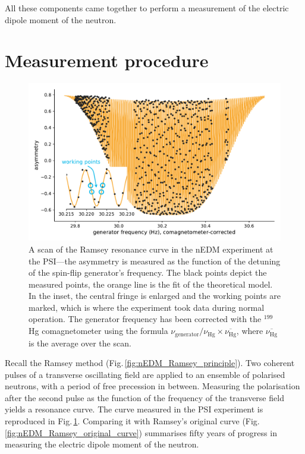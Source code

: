 All these components came together to perform a measurement of the electric dipole moment of the neutron.



\section{Measurement procedure}
\begin{figure}
  \centering
  \includegraphics[width=0.8\linewidth]{gfx/nEDMatPSI/ramsey_scan.pdf}
  \caption{A scan of the Ramsey resonance curve in the nEDM experiment at the PSI---the asymmetry is measured as the function of the detuning of the spin-flip generator's frequency. The black points depict the measured points, the orange line is the fit of the theoretical model. In the inset, the central fringe is enlarged and the working points are marked, which is where the experiment took data during normal operation. The generator frequency has been corrected with the $^{199}$Hg comagnetometer using the formula $\nu_\text{generator} / \nu_\text{Hg} \times \overline{\nu_\text{Hg}}$, where $\overline{\nu_\text{Hg}}$ is the average over the scan.}
  \label{fig:ramsey_scan}
\end{figure}

Recall the Ramsey method (Fig.\,\ref{fig:nEDM_Ramsey_principle}). Two coherent pulses of a transverse oscillating field are applied to an ensemble of polarised neutrons, with a period of free precession in between. Measuring the polarisation after the second pulse as the function of the frequency of the transverse field yields a resonance curve. The curve measured in the PSI experiment is reproduced in Fig.\,\ref{fig:ramsey_scan}. Comparing it with Ramsey's original curve (Fig.\,\ref{fig:nEDM_Ramsey_original_curve}) summarises fifty years of progress in measuring the electric dipole moment of the neutron.

